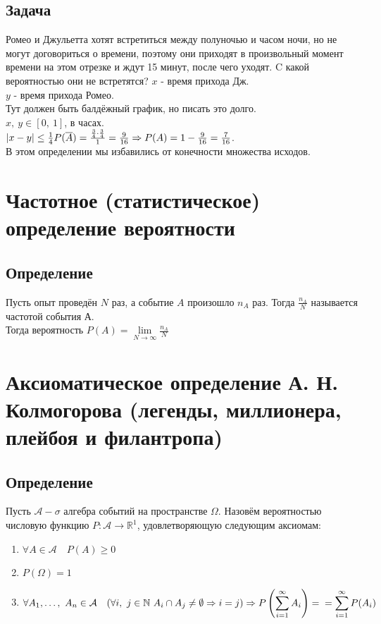 \documentclass[12pt, a4paper]{article}
\begin{document}
    \subsection*{Задача}
    Ромео и Джульетта хотят встретиться между полуночью и часом ночи, но не могут договориться о времени, поэтому они приходят в произвольный момент времени на этом отрезке и ждут 15 минут, после чего уходят. C какой вероятностью они не встретятся?
    $x$ - время прихода Дж.\\
    $y$ - время прихода Ромео.\\
    Тут должен быть балдёжный график, но писать это долго.\\
    $x,\ y\in [0,\ 1]$, в часах.\\
    $|x - y| \leq \frac{1}{4}\\
    P(\overline{A}) = \frac{\frac{3}{4}\cdot \frac{3}{4}}{1} = \frac{9}{16}\Rightarrow P(A) = 1 - \frac{9}{16} = \frac{7}{16}$.\\
    В этом определении мы избавились от конечности множества исходов.
    \section*{Частотное (статистическое) определение вероятности}
    \subsection*{Определение}
    Пусть опыт проведён $N$ раз, а событие $A$ произошло $n_A$ раз. Тогда $\frac{n_A}{N}$ называется частотой события А.\\
    Тогда вероятность $P(A) = \lim\limits_{N\to\infty} \frac{n_A}{N}$
    \section*{Аксиоматическое определение А. Н. Колмогорова (легенды, миллионера, плейбоя и филантропа)}
    \subsection*{Определение}
    Пусть $\mathcal{A} - \sigma$ алгебра событий на пространстве $\Omega$. Назовём вероятностью числовую функцию $P: \mathcal{A}\to \mathbb{R}^1$, удовлетворяющую следующим аксиомам:
    \begin{enumerate}
        \item $\forall A\in \mathcal{A}\quad P(A) \geq 0$
        \item $P(\Omega) = 1$
        \item $\forall A_1,\dots,\ A_n\in \mathcal{A}\quad (\forall i,\ j\in \mathbb{N}\  A_i\cap A_j \neq \emptyset\Rightarrow i = j)\Rightarrow P\left(\displaystyle \sum_{i = 1}^{\infty}A_i\right) =\\
        = \displaystyle\sum_{i = 1}^{\infty}P(A_i)$
    \end{enumerate}
\end{document}
